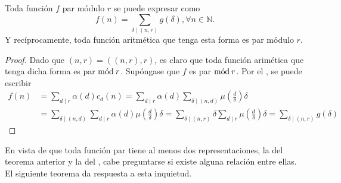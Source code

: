 \begin{theorem}
Toda función $f$ par módulo $r$ se puede expresar como
\begin{equation}\label{eq:fou2}
    f(n) = \sum_{\delta \mid (n,r)} g(\delta), \forall n \in \mathbb{N}.
\end{equation}
Y recíprocamente, toda función aritmética que tenga esta forma es par módulo $r$.
\end{theorem}
\begin{proof}
Dado que $(n,r)=((n,r),r)$, es claro que toda función arimética que tenga dicha forma es par $\mathrm{m\acute{o}d\:}r$. Supóngase que $f$ es par $\mathrm{m\acute{o}d\:}r$. Por el , se puede escribir
\begin{align*}
    f(n) & = \sum_{d \mid r} \alpha(d) c_d(n) = \sum_{d \mid r} \alpha(d) \sum_{\delta \mid (n,d)} \mu \left( \frac{d}{\delta} \right) \delta \\
         & = \sum_{\delta \mid (n,d)} \sum_{d \mid r} \alpha(d) \mu \left( \frac{d}{\delta} \right) \delta = \sum_{\delta \mid (n,r)} \delta \sum_{d \mid r} \mu \left( \frac{d}{\delta} \right) \delta = \sum_{\delta \mid (n,r)} g(\delta) 
\end{align*}
\end{proof}

En vista de que toda función par tiene al menos dos representaciones, la del teorema anterior y la del , cabe preguntarse si existe alguna relación entre ellas. El siguiente teorema da respuesta a esta inquietud.

